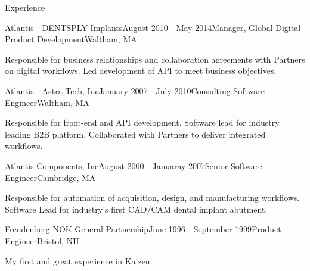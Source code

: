 \documentclass{resume}
\begin{document}
\begin{rSection}{Experience}
\begin{rSubsection}{\href{https://dentsplysirona.com}{Atlantis - DENTSPLY Implants}}{August 2010 - May 2014}{Manager, Global Digital Product Development}{Waltham, MA}
\item Responsible for business relationships and collaboration agreements with Partners on digital workflows.  Led development of API to meet business objectives.
\end{rSubsection}

\begin{rSubsection}{\href{https://dentsplysirona.com}{Atlantis - Astra Tech, Inc}}{January 2007 - July 2010}{Consulting Software Engineer}{Waltham, MA}
\item Responsible for front-end and API development. Software lead for industry leading B2B platform. Collaborated with Partners to deliver integrated workflows.
\end{rSubsection}

\begin{rSubsection}{\href{https://dentsplysirona.com}{Atlantis Components, Inc}}{August 2000 - Januaray 2007}{Senior Software Engineer}{Cambridge, MA}
\item Responsible for automation of acquisition, design, and manufacturing workflows. Software Lead for industry's first CAD/CAM dental implant abutment.
\end{rSubsection}

\pagebreak

\begin{rSubsection}{\href{https://fst.com}{Freudenberg-NOK General Partnership}}{June 1996 - September 1999}{Product Engineer}{Bristol, NH}
\item My first and great experience in Kaizen.
\end{rSubsection}

\end{rSection}
\end{document}
